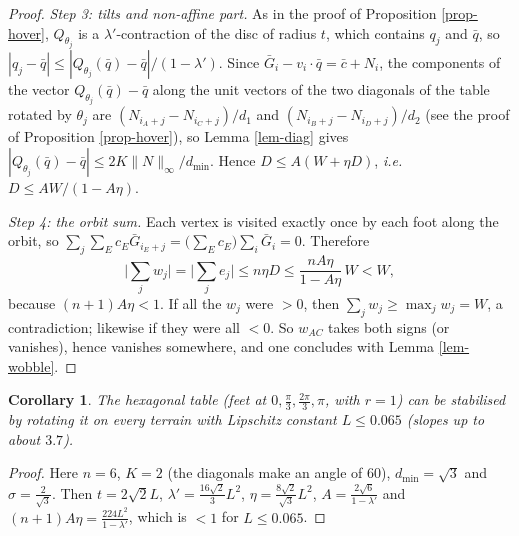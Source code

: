 \documentclass[a4paper,11pt,twoside,leqno]{article}
\newtheorem{cor}[teo]{Corollary}
\newcommand{\ie}[0]{\emph{i.e.} }
\numberwithin{equation}{section}
\begin{document}
\begin{proof}
\emph{Step 3: tilts and non-affine part.} As in the proof of Proposition \ref{prop-hover}, $Q_{\theta_j}$ is a $\lambda'$-contraction of the disc of radius $t$, which contains $q_j$ and $\bar q$, so $|q_j - \bar q| \leq |Q_{\theta_j}(\bar q) - \bar q|/(1-\lambda')$. Since $\bar G_i - v_i \cdot \bar q = \bar c + N_i$, the components of the vector $Q_{\theta_j}(\bar q) - \bar q$ along the unit vectors of the two diagonals of the table rotated by $\theta_j$ are $(N_{i_A+j} - N_{i_C+j})/d_1$ and $(N_{i_B+j} - N_{i_D+j})/d_2$ (see the proof of Proposition \ref{prop-hover}), so Lemma \ref{lem-diag} gives $|Q_{\theta_j}(\bar q) - \bar q| \leq 2K \|N\|_\infty / d_{\min}$. Hence $D \leq A (W + \eta D)$, \ie $D \leq AW/(1 - A\eta)$.

\emph{Step 4: the orbit sum.} Each vertex is visited exactly once by each foot along the orbit, so $\sum_j \sum_E c_E \bar G_{i_E + j} = \big(\sum_E c_E\big) \sum_i \bar G_i = 0$. Therefore
\[
\Big| \sum_j w_j \Big| = \Big| \sum_j e_j \Big| \leq n \eta D \leq \frac{n A \eta}{1 - A\eta}\, W < W,
\]
because $(n+1)A\eta < 1$. If all the $w_j$ were $>0$, then $\sum_j w_j \geq \max_j w_j = W$, a contradiction; likewise if they were all $<0$. So $w_{AC}$ takes both signs (or vanishes), hence vanishes somewhere, and one concludes with Lemma \ref{lem-wobble}.
\end{proof}

\begin{cor}\label{cor-hexagon-L}
The hexagonal table (feet at $0, \frac{\pi}{3}, \frac{2\pi}{3}, \pi$, with $r = 1$) can be stabilised by rotating it on every terrain with Lipschitz constant $L \leq 0.065$ (slopes up to about $3.7$\textdegree{}).
\end{cor}
\begin{proof}
Here $n = 6$, $K = 2$ (the diagonals make an angle of $60$\textdegree{}), $d_{\min} = \sqrt{3}$ and $\sigma = \frac{2}{\sqrt{3}}$. Then $t = 2\sqrt{2} L$, $\lambda' = \frac{16\sqrt{2}}{3}L^2$, $\eta = \frac{8\sqrt{2}}{\sqrt{3}} L^2$, $A = \frac{2\sqrt{6}}{1-\lambda'}$ and $(n+1)A\eta = \frac{224 L^2}{1-\lambda'}$, which is $<1$ for $L \leq 0.065$.
\end{proof}
\end{document}
